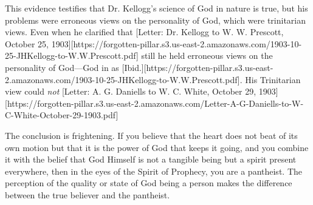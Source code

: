 This evidence testifies that Dr. Kellogg's science of God in nature is true, but his problems were erroneous views on the personality of God, which were trinitarian views. Even when he clarified that [Letter: Dr. Kellogg to W. W. Prescott, October 25, 1903][https://forgotten-pillar.s3.us-east-2.amazonaws.com/1903-10-25-JHKellogg-to-W.W.Prescott.pdf] still he held erroneous views on the personality of God—God in  as [Ibid.][https://forgotten-pillar.s3.us-east-2.amazonaws.com/1903-10-25-JHKellogg-to-W.W.Prescott.pdf]. His Trinitarian view could \textit{not} [Letter: A. G. Daniells to W. C. White, October 29, 1903][https://forgotten-pillar.s3.us-east-2.amazonaws.com/Letter-A-G-Daniells-to-W-C-White-October-29-1903.pdf]

The conclusion is frightening. If you believe that the heart does not beat of its own motion but that it is the power of God that keeps it going, and you combine it with the belief that God Himself is not a tangible being but a spirit present everywhere, then in the eyes of the Spirit of Prophecy, you are a pantheist. The perception of the quality or state of God being a person makes the difference between the true believer and the pantheist.


